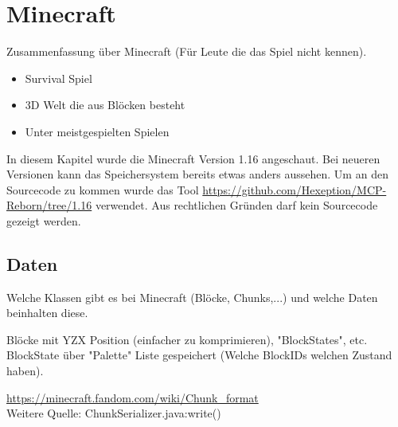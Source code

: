 \section{Minecraft}
Zusammenfassung über Minecraft (Für Leute die das Spiel nicht kennen).
\begin{itemize}
    \item Survival Spiel
    \item 3D Welt die aus Blöcken besteht
    \item Unter meistgespielten Spielen
\end{itemize}


In diesem Kapitel wurde die Minecraft Version 1.16 angeschaut. 
Bei neueren Versionen kann das Speichersystem bereits etwas anders aussehen. Um an den Sourcecode zu kommen wurde das Tool 
\url{https://github.com/Hexeption/MCP-Reborn/tree/1.16} verwendet. Aus rechtlichen Gründen darf kein
Sourcecode gezeigt werden.

\subsection{Daten}
Welche Klassen gibt es bei Minecraft (Blöcke, Chunks,...) und welche Daten 
beinhalten diese.

Blöcke mit YZX Position (einfacher zu komprimieren), "BlockStates", etc.\\
BlockState über "Palette" Liste gespeichert (Welche BlockIDs welchen Zustand haben).

\url{https://minecraft.fandom.com/wiki/Chunk_format}\\ 
Weitere Quelle: ChunkSerializer.java:write()

